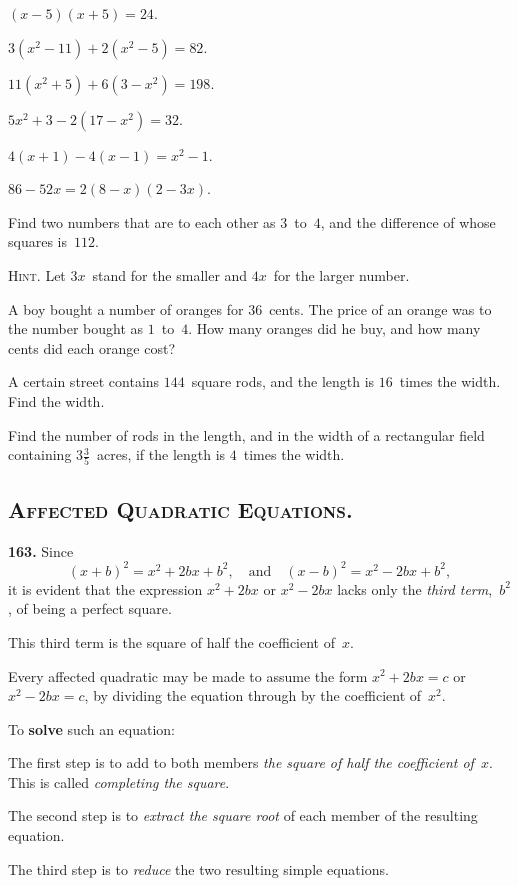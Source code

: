 \documentclass[12pt]{book}[2005/09/16]
\newcommand{\Section}[1]{\subsection*{\centering\normalfont\small\scshape #1}}
\newcommand{\Paragraph}[1]{\medskip\par\textbf{#1}}
\newenvironment{Remark}[1][]{\par\small\textsc{#1}}{\par}
\newcommand{\Item}[1]{\vspace{4pt plus 16pt}\makebox[1em][r]{\textbf{#1}\ }}
\begin{document}
\Item{5.}  $(x - 5)(x + 5) = 24$.

\Item{6.}  $3(x^{2} - 11) + 2(x^{2} - 5) = 82$.

\Item{7.}  $11(x^{2} + 5) + 6(3 - x^{2}) = 198$.

\Item{8.}  $5x^{2} + 3 - 2(17 - x^{2}) = 32$.

\Item{9.}  $4(x + 1) - 4(x - 1) = x^{2} - 1$.

\Item{10.}  $86 - 52x = 2(8 - x)(2 - 3x)$.

\Item{11.}  Find two numbers that are to each other as $3$~to~$4$,
and the difference of whose squares is~$112$.

\begin{Remark}[Hint.]  Let $3x$~stand for the smaller and $4x$~for the larger number.
\end{Remark}

\Item{12.}  A boy bought a number of oranges for $36$~cents.
The price of an orange was to the number bought as $1$~to~$4$.
How many oranges did he buy, and how many cents
did each orange cost?

\Item{13.}  A certain street contains $144$~square rods, and the
length is $16$~times the width.  Find the width.

\Item{14.}  Find the number of rods in the length, and in the
width of a rectangular field containing $3\frac{3}{5}$~acres, if the
length is $4$~times the width.


\Section{Affected Quadratic Equations.}

\Paragraph{163.}  Since
\[
(x + b)^{2} = x^{2} + 2bx + b^{2}, \quad\text{and}\quad
(x - b)^{2} = x^{2} - 2bx + b^{2},
\]
it is evident that the expression $x^{2} + 2bx$ or $x^{2} - 2bx$ lacks
only the \emph{third term},~$b^{2}$, of being a perfect square.

This third term is the square of half the coefficient of~$x$.

Every affected quadratic may be made to assume the
form $x^{2} + 2bx = c$ or $x^{2} - 2bx = c$, by dividing the equation
through by the coefficient of~$x^{2}$.

To \textbf{solve} such an equation:

The first step is to add to both members \emph{the square of
half the coefficient of~$x$}.  This is called \emph{completing the square}.

The second step is to \emph{extract the square root} of each member
of the resulting equation.

The third step is to \emph{reduce} the two resulting simple
equations.
\end{document}
